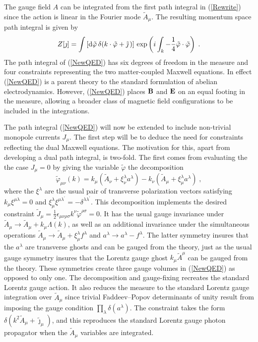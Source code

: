 \documentclass[a4paper,a4paper]{article}
\begin{document}
The gauge field $A$ can be integrated from the first path integral in (\ref{Rewrite}) since the action is linear in the Fourier mode $\tilde{A}_\mu$.  The resulting momentum space path integral is given by
\begin{equation}
\label{NewQED}
Z[\jmath] = \int \left[ {\rm d} \tilde{\varphi} \,  \delta( k \cdot \tilde{\varphi} + \tilde{\jmath} \,) \right]  \, \exp \left( i \int_k - {\small \frac{1}{4}} \tilde{\varphi} \cdot \tilde{\varphi} \right) \; .
\end{equation}
The path integral of (\ref{NewQED}) has six degrees of freedom in the measure and four constraints representing the two matter-coupled Maxwell equations.  In effect (\ref{NewQED}) is a parent theory to the standard formulation of abelian electrodynamics. However, (\ref{NewQED}) places ${\bf B}$ and ${\bf E}$ on an equal footing in the measure, allowing a broader class of magnetic field configurations to be included in the integrations. 

The path integral (\ref{NewQED}) will now be extended to include non-trivial monopole currents $J_\mu$.  The first step will be to deduce the need for constraints reflecting the dual Maxwell equations. The motivation for this, apart from developing a dual path integral, is two-fold. The first comes from evaluating the  the case $J_\mu = 0$ by giving the variable $\tilde{\varphi}$ the decomposition
\begin{equation}
\label{NoMonopole}
\tilde{\varphi}_{\mu \nu} (k)  =   k_\mu ( \tilde{A}_\nu  + \xi^\lambda_\nu a^\lambda )  - k_\nu (  \tilde{A}_\mu  + \xi^\lambda_\mu a^\lambda ) \; ,
\end{equation}
where the $\xi^\lambda$ are the usual pair of transverse polarization vectors satisfying $k_\mu \xi^{\mu \lambda} = 0$ and $\xi_\mu^\lambda \xi^{\mu \lambda^\prime} = - \delta^{\lambda \lambda^\prime}$.  This decomposition implements the desired constraint $\tilde{J}_\mu = \frac{1}{2} \epsilon_{\mu \nu \rho \sigma} k^\nu \tilde{\varphi}^{\rho \sigma} = 0$. It has the usual gauge invariance under $\tilde{A}_\mu \rightarrow \tilde{A}_\mu + k_\mu \Lambda (k)$, as well as an additional invariance under the simultaneous operations $\tilde{A}_\mu \rightarrow \tilde{A}_\mu + \xi^\lambda_\mu f^\lambda$ and $a^\lambda \rightarrow a^\lambda - f^\lambda$.  The latter symmetry insures that the $a^\lambda$ are transverse ghosts and can be gauged from the theory, just as the usual gauge symmetry insures that the Lorentz gauge ghost $k_\mu \tilde{A}^\mu$ can be gauged from the theory.  These symmetries create three gauge volumes in (\ref{NewQED}) as opposed to only one. The decomposition and gauge-fixing recreates the standard Lorentz gauge action. It also reduces the measure to the standard Lorentz gauge integration over $\tilde{A}_\mu$ since trivial Faddeev--Popov determinants of unity result from imposing the gauge condition $\prod_\lambda \delta(a^\lambda)$.  The constraint takes the form $\delta( k^2 \tilde{A}_\mu + \tilde{\jmath}_\mu )$, and this reproduces the standard Lorentz gauge photon propagator when the $\tilde{A}_\mu$ variables are integrated. 
\end{document}
